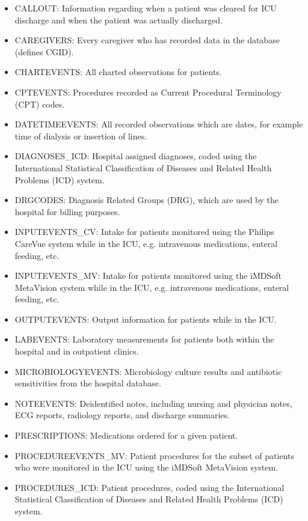 \documentclass[english]{article}
\begin{document}
\begin{itemize}
  \item CALLOUT: Information regarding when a patient was cleared for ICU discharge and when the patient was actually discharged.
  \item CAREGIVERS: Every caregiver who has recorded data in the database (defines CGID).
  \item CHARTEVENTS: All charted observations for patients.
  \item CPTEVENTS: Procedures recorded as Current Procedural Terminology (CPT) codes.
  \item DATETIMEEVENTS: All recorded observations which are dates, for example time of dialysis or insertion of lines.
  \item DIAGNOSES\_ICD: Hospital assigned diagnoses, coded using the International Statistical Classification of Diseases and Related Health Problems (ICD) system.
  \item DRGCODES: Diagnosis Related Groups (DRG), which are used by the hospital for billing purposes.
  \item INPUTEVENTS\_CV: Intake for patients monitored using the Philips CareVue system while in the ICU, e.g. intravenous medications, enteral feeding, etc.
  \item INPUTEVENTS\_MV: Intake for patients monitored using the iMDSoft MetaVision system while in the ICU, e.g. intravenous medications, enteral feeding, etc.
  \item OUTPUTEVENTS: Output information for patients while in the ICU.
  \item LABEVENTS: Laboratory measurements for patients both within the hospital and in outpatient clinics.
  \item MICROBIOLOGYEVENTS: Microbiology culture results and antibiotic sensitivities from the hospital database.
  \item NOTEEVENTS: Deidentified notes, including nursing and physician notes, ECG reports, radiology reports, and discharge summaries.
  \item PRESCRIPTIONS: Medications ordered for a given patient.
  \item PROCEDUREEVENTS\_MV: Patient procedures for the subset of patients who were monitored in the ICU using the iMDSoft MetaVision system.
  \item PROCEDURES\_ICD: Patient procedures, coded using the International Statistical Classification of Diseases and Related Health Problems (ICD) system.
\end{itemize}
\end{document}
